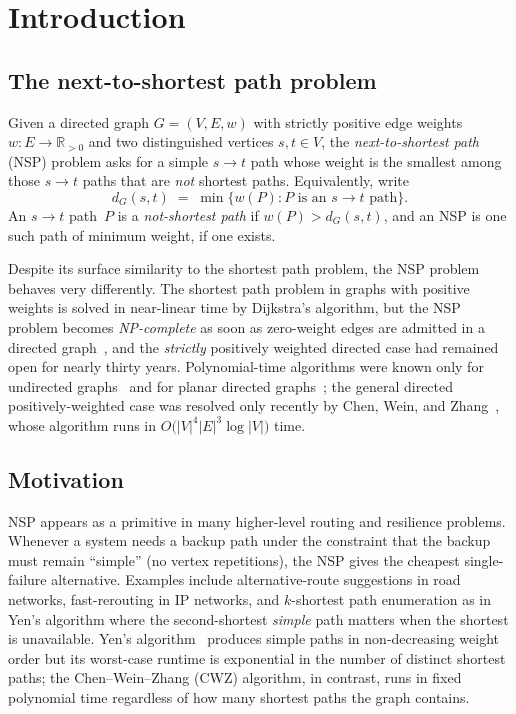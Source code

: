 \tableofcontents

\chapter{Introduction}
\label{ch:intro}

\section{The next-to-shortest path problem}

Given a directed graph $G=(V,E,w)$ with strictly positive edge weights
$w:E\to\mathbb{R}_{>0}$ and two distinguished vertices $s,t\in V$, the
\emph{next-to-shortest path} (NSP) problem asks for a simple $s\to t$ path
whose weight is the smallest among those $s\to t$ paths that are \emph{not}
shortest paths. Equivalently, write
\[
  d_G(s,t)\;=\;\min\bigl\{w(P) : P \text{ is an } s\to t \text{ path}\bigr\}.
\]
An $s\to t$ path~$P$ is a \emph{not-shortest path} if $w(P) > d_G(s,t)$, and an
NSP is one such path of minimum weight, if one exists.

Despite its surface similarity to the shortest path problem, the NSP problem
behaves very differently. The shortest path problem in graphs with positive
weights is solved in near-linear time by Dijkstra's algorithm, but the NSP
problem becomes \emph{NP-complete} as soon as zero-weight edges are
admitted in a directed graph~\cite{LallaSrinivasan1992}, and the
\emph{strictly} positively weighted directed case had remained open for nearly
thirty years. Polynomial-time algorithms were known only for undirected
graphs~\cite{KrasikovNoble2004} and for planar directed
graphs~\cite{Wu2010}; the general directed positively-weighted case was
resolved only recently by Chen, Wein, and Zhang~\cite{ChenWeinZhang2025},
whose algorithm runs in $O\bigl(|V|^{4}|E|^{3}\log|V|\bigr)$ time.

\section{Motivation}

NSP appears as a primitive in many higher-level routing and resilience
problems. Whenever a system needs a backup path under the constraint that
the backup must remain ``simple'' (no vertex repetitions), the NSP gives the
cheapest single-failure alternative. Examples include alternative-route
suggestions in road networks, fast-rerouting in IP networks, and
$k$-shortest path enumeration as in Yen's algorithm where the second-shortest
\emph{simple} path matters when the shortest is unavailable. Yen's
algorithm~\cite{Yen1971} produces simple paths in non-decreasing weight order
but its worst-case runtime is exponential in the number of distinct shortest
paths; the Chen--Wein--Zhang (CWZ) algorithm, in contrast, runs in fixed
polynomial time regardless of how many shortest paths the graph contains.

